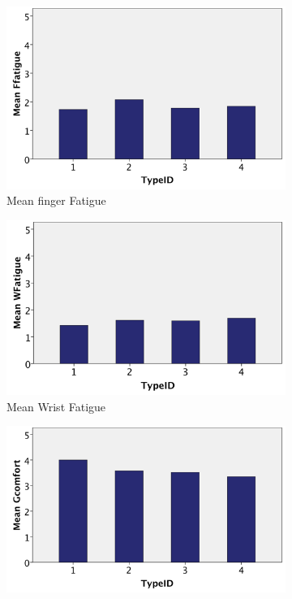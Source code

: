 \begin{figure}[h]
\begin{subfigure}[b]{0.4\textwidth}
        \includegraphics[width=\textwidth]{figures/meanFFatigue}
        \caption{Mean finger Fatigue}
        \label{fig:meanFFatigue}
    \end{subfigure}
    \hfill
    \begin{subfigure}[b]{0.4\textwidth}
        \centering
        \includegraphics[width=\textwidth]{figures/meanWFatigue}
        \caption{Mean Wrist Fatigue}
        \label{fig:meanWFatigue}
    \end{subfigure}
    \hfill
    \begin{subfigure}[b]{0.4\textwidth}
        \centering
        \includegraphics[width=\textwidth]{figures/meanGComfort}

\end{subfigure}
\end{figure}
